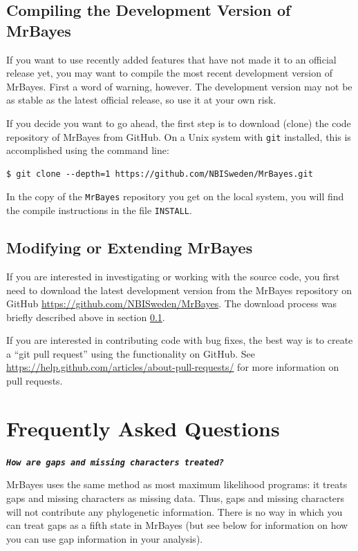 \documentclass[12pt]{book}
\newcommand{\ttt}[1]{\texttt{#1}}
\newcommand{\tb}[1]{\ttt{\textbf{#1}}}
\begin{document}
\subsection{Compiling the Development Version of MrBayes}\label{compileDevVersion}

If you want to use recently added features that have not made it to an official release yet, you
may want to compile the most recent development version of MrBayes. First a word of warning,
however. The development version may not be as stable as the latest official release, so use it at
your own risk.

If you decide you want to go ahead, the first step is to download (clone) the code repository of
MrBayes from GitHub. On a Unix system with \texttt{git} installed, this is accomplished using the
command line:

\begin{Verbatim}
$ git clone --depth=1 https://github.com/NBISweden/MrBayes.git
\end{Verbatim}

In the copy of the \texttt{MrBayes} repository you get on the local system, you will find the
compile instructions in the file \texttt{INSTALL}.

\subsection{Modifying or Extending MrBayes}\label{modifyingOrExtendingMrBayes}

If you are interested in investigating or working with the source code, you first need to download
the latest development version from the MrBayes repository on GitHub
\url{https://github.com/NBISweden/MrBayes}. The download process was briefly described above in
section \ref{compileDevVersion}.

If you are interested in contributing code with bug fixes, the best way is to create a ``git pull
request'' using the functionality on GitHub. See
\url{https://help.github.com/articles/about-pull-requests/} for more information on pull requests.


\section{Frequently Asked Questions}
\label{FAQ}

\tb{\it{How are gaps and missing characters treated?}}

MrBayes uses the same method as most maximum likelihood programs: it treats gaps and missing
characters as missing data. Thus, gaps and missing characters will not contribute any phylogenetic
information. There is no way in which you can treat gaps as a fifth state in MrBayes (but see below
for information on how you can use gap information in your analysis).
\end{document}

